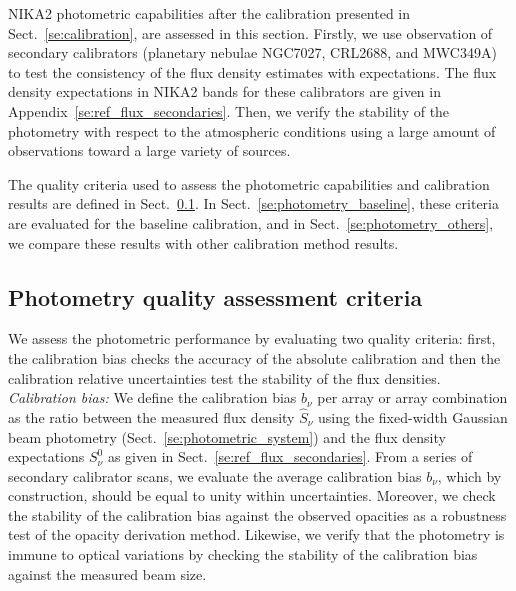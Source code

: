 %

NIKA2 photometric capabilities after the calibration presented in
Sect.~\ref{se:calibration}, are assessed in this section. Firstly,
we use observation of secondary calibrators (planetary nebulae NGC7027, CRL2688, and
MWC349A) to test the consistency of the flux density estimates with
expectations. The flux density expectations
in NIKA2 bands for these calibrators are given in
Appendix~\ref{se:ref_flux_secondaries}. Then,
we verify the stability of the photometry with
respect to the atmospheric conditions using a large amount of
observations toward a large variety of sources. 

The quality criteria used to assess the photometric
capabilities and calibration results are defined in
Sect.~\ref{se:photometry_criteria}.
In Sect.~\ref{se:photometry_baseline}, these criteria are evaluated
for the baseline calibration, and in Sect.~\ref{se:photometry_others},
we compare these results with other calibration method results. 


\subsection{Photometry quality assessment criteria}
\label{se:photometry_criteria}

We assess the photometric performance by evaluating two
quality criteria: first, the calibration bias checks the accuracy of
the absolute calibration and then the calibration relative
uncertainties test the stability of the flux densities. \\

\noindent \emph{Calibration bias: }We define the calibration bias
$b_{\nu}$ per array or array combination as
the ratio between the measured flux density $\hat{S}_{\nu}$ using the
fixed-width Gaussian beam photometry
(Sect.~\ref{se:photometric_system}) and the flux density
expectations $S^{0}_{\nu}$ as given in
Sect.~\ref{se:ref_flux_secondaries}. From a series of
secondary calibrator scans, we evaluate the average calibration bias
$b_{\nu}$, which by construction, should be equal to
unity within uncertainties.
Moreover, we check the stability of the calibration bias against
the observed opacities as a robustness test of the
opacity derivation method. Likewise, we verify that the photometry is
immune to optical variations by checking the stability of the
calibration bias against the measured beam size.\\

